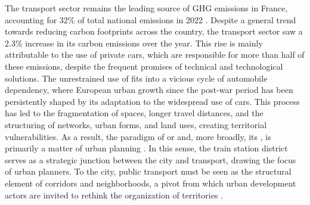 \begin{refsegment}
The transport sector remains the leading source of \acrfull{GHG} emissions in France, accounting for 32\% of total national emissions in 2022 \textcolor{blue}{\autocite[41-53]{ministere_de_la_transition_ecologique_et_de_la_cohesion_des_territoires_chiffres_2024}}. Despite a general trend towards reducing carbon footprints across the country, the transport sector saw a 2.3\% increase in its carbon emissions over the year. This rise is mainly attributable to the use of private cars, which are responsible for more than half of these emissions, despite the frequent promises of technical and technological solutions. The unrestrained use of  fits into a vicious cycle of automobile dependency, where European urban growth since the post-war period has been persistently shaped by its adaptation to the widespread use of cars. This process has led to the fragmentation of spaces, longer travel distances, and the structuring of networks, urban forms, and land uses, creating territorial vulnerabilities. As a result, the paradigm of  or  and, more broadly, its , is primarily a matter of urban planning \textcolor{blue}{\autocite{societe_francaise_des_urbanistes_decarbonation_2024}}. In this sense, the train station district serves as a strategic junction between the city and transport, drawing the focus of urban planners. To  the city, public transport must be seen as the structural element of corridors and neighborhoods, a pivot from which urban development actors are invited to rethink the organization of territories \textcolor{blue}{\autocite[8]{boisclair_retisser_2013}}.%


\end{refsegment}
